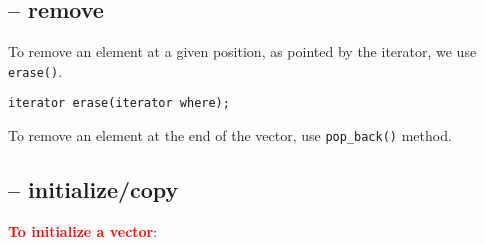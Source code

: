 \subsection{-- remove}

To remove an element at a given position, as pointed by the iterator, we use
\verb!erase()!.
\begin{verbatim}
iterator erase(iterator where);
\end{verbatim}

To remove an element at the end of the vector, use \verb!pop_back()! method.

\subsection{-- initialize/copy}

\textcolor{red}{\bf To initialize a vector}:

